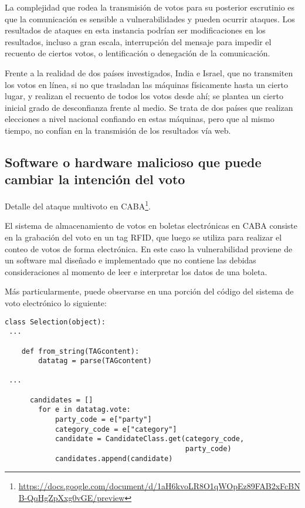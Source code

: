 La complejidad que rodea la transmisión de votos para su posterior escrutinio es que la comunicación es sensible a vulnerabilidades y pueden ocurrir ataques. Los resultados de ataques en esta instancia podrían ser modificaciones en los resultados, incluso a gran escala, interrupción del mensaje para impedir el recuento de ciertos votos, o lentificación o denegación de la comunicación.

Frente a la realidad de dos países investigados, India e Israel, que no transmiten los votos en línea, si no que trasladan las máquinas físicamente hasta un cierto lugar, y realizan el recuento de todos los votos desde ahí; se plantea un cierto inicial grado de desconfianza frente al medio. Se trata de dos países que realizan elecciones a nivel nacional confiando en estas máquinas, pero que al mismo tiempo, no confían en la transmisión de los resultados vía web.

\subsection{Software o hardware malicioso que puede cambiar la intención del voto}
Detalle del ataque multivoto en CABA\footnote{\url{https://docs.google.com/document/d/1aH6kvoLR8O1qWOpEz89FAB2xFcBNB-QqHgZpXxg0vGE/preview}}.

El sistema de almacenamiento de votos en boletas electrónicas en CABA consiste en la grabación del voto en un tag RFID, que luego se utiliza para realizar el conteo de votos de forma electrónica. En este caso la vulnerabilidad proviene de un software mal diseñado e implementado que no contiene las debidas consideraciones al momento de leer e interpretar los datos de una boleta.

Más particularmente, puede observarse en una porción del código del sistema de voto electrónico lo siguiente:

\begin{lstlisting}
class Selection(object):
 ...

    def from_string(TAGcontent):
        datatag = parse(TAGcontent)

 ...

      candidates = []
        for e in datatag.vote:
            party_code = e["party"]
            category_code = e["category"]
            candidate = CandidateClass.get(category_code,
                                           party_code)
            candidates.append(candidate)

\end{lstlisting}

